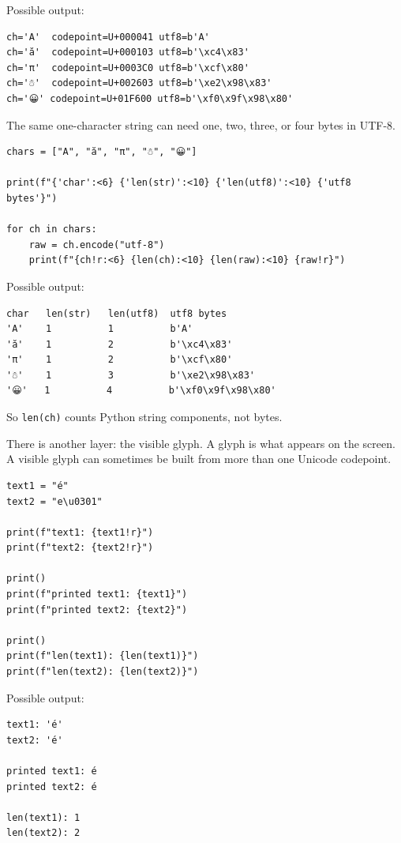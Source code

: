 Possible output:

\begin{verbatim}
ch='A'  codepoint=U+000041 utf8=b'A'
ch='ă'  codepoint=U+000103 utf8=b'\xc4\x83'
ch='π'  codepoint=U+0003C0 utf8=b'\xcf\x80'
ch='☃'  codepoint=U+002603 utf8=b'\xe2\x98\x83'
ch='😀' codepoint=U+01F600 utf8=b'\xf0\x9f\x98\x80'
\end{verbatim}

The same one-character string can need one, two, three, or four bytes in UTF-8.

\begin{verbatim}
chars = ["A", "ă", "π", "☃", "😀"]

print(f"{'char':<6} {'len(str)':<10} {'len(utf8)':<10} {'utf8 bytes'}")

for ch in chars:
    raw = ch.encode("utf-8")
    print(f"{ch!r:<6} {len(ch):<10} {len(raw):<10} {raw!r}")
\end{verbatim}

Possible output:

\begin{verbatim}
char   len(str)   len(utf8)  utf8 bytes
'A'    1          1          b'A'
'ă'    1          2          b'\xc4\x83'
'π'    1          2          b'\xcf\x80'
'☃'    1          3          b'\xe2\x98\x83'
'😀'   1          4          b'\xf0\x9f\x98\x80'
\end{verbatim}

So \texttt{len(ch)} counts Python string components, not bytes.

There is another layer: the visible glyph. A glyph is what appears on the screen. A visible glyph can sometimes be built from more than one Unicode codepoint.

\begin{verbatim}
text1 = "é"
text2 = "e\u0301"

print(f"text1: {text1!r}")
print(f"text2: {text2!r}")

print()
print(f"printed text1: {text1}")
print(f"printed text2: {text2}")

print()
print(f"len(text1): {len(text1)}")
print(f"len(text2): {len(text2)}")
\end{verbatim}

Possible output:

\begin{verbatim}
text1: 'é'
text2: 'é'

printed text1: é
printed text2: é

len(text1): 1
len(text2): 2
\end{verbatim}


